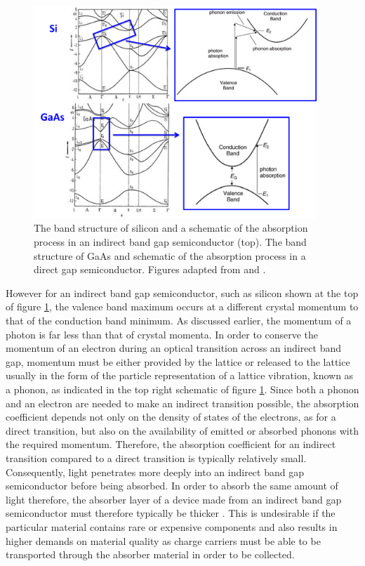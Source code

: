 \begin{figure}[h!]
  \centering
    \includegraphics[width=0.95\textwidth]{figures/Si_and_GaAs.png}
    \caption{The band structure of silicon and a schematic of the absorption process in an indirect band gap semiconductor (top). The band structure of GaAs and schematic of the absorption process in a direct gap semiconductor. Figures adapted from  and .}
  \label{Si_and_GaAs}
\end{figure}

However for an indirect band gap semiconductor, such as silicon shown at the top of figure \ref{Si_and_GaAs}, the valence band maximum occurs at a different crystal momentum to that of the conduction band minimum. As discussed earlier, the momentum of a photon is far less than that of crystal momenta. In order to conserve the momentum of an electron during an optical transition across an indirect band gap, momentum must be either provided by the lattice or released to the lattice usually in the form of the particle representation of a lattice vibration, known as a phonon, as indicated in the top right schematic of figure \ref{Si_and_GaAs}. Since both a phonon and an electron are needed to make an indirect transition possible, the absorption coefficient depends not only on the density of states of the electrons, as for a direct transition, but also on the availability of emitted or absorbed phonons with the required momentum. Therefore, the absorption coefficient for an indirect transition compared to a direct transition is typically relatively small. Consequently, light penetrates more deeply into an indirect band gap semiconductor before being absorbed. In order to absorb the same amount of light therefore, the absorber layer of a device made from an indirect band gap semiconductor must therefore typically be thicker \cite{PV_bands_book}. This is undesirable if the particular material contains rare or expensive components and also results in higher demands on material quality as charge carriers must be able to be transported through the absorber material in order to be collected.

